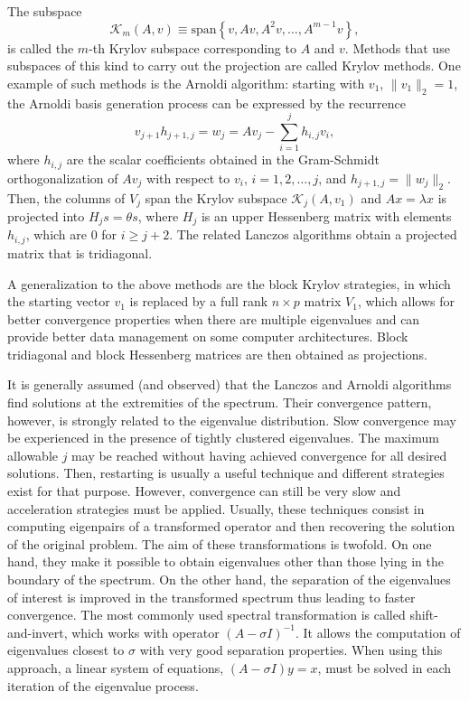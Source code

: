 	The subspace
\begin{equation}
\mathcal{K}_m(A,v)\equiv\mathrm{span}\left\{v,Av,A^2v,\ldots,A^{m-1}v\right\},\label{eq:krylov}
\end{equation}
is called the $m$-th Krylov subspace corresponding to $A$ and $v$. Methods that use subspaces of this kind to carry out the projection are called Krylov methods. One example of such methods is the Arnoldi algorithm: starting with $v_1$, $\|v_1\|_2=1$, the Arnoldi basis generation process can be expressed by the recurrence
\begin{equation}
v_{j+1}h_{j+1,j}=w_j=Av_j-\sum_{i=1}^jh_{i,j}v_i,
\end{equation}
where $h_{i,j}$ are the scalar coefficients obtained in the Gram-Schmidt orthogonalization of $Av_j$ with respect to $v_i$, $i=1,2,\ldots,j$, and $h_{j+1,j}=\|w_j\|_2$. Then, the columns of $V_j$ span the Krylov subspace $\mathcal{K}_j(A,v_1)$ and $Ax=\lambda x$ is projected into $H_js=\theta s$, where $H_j$ is an upper Hessenberg matrix with elements $h_{i,j}$, which are 0 for $i\geq j+2$. The related Lanczos algorithms obtain a projected matrix that is tridiagonal.

	A generalization to the above methods are the block Krylov strategies, in which the starting vector $v_1$ is replaced by a full rank $n\times p$ matrix $V_1$, which allows for better convergence properties when there are multiple eigenvalues and can provide better data management on some computer architectures. Block tridiagonal and block Hessenberg matrices are then obtained as projections.

	It is generally assumed (and observed) that the Lanczos and Arnoldi algorithms find solutions at the extremities of the spectrum. Their convergence pattern, however, is strongly related to the eigenvalue distribution. Slow convergence may be experienced in the presence of tightly clustered eigenvalues. The maximum allowable $j$ may be reached without having achieved convergence for all desired solutions. Then, restarting is usually a useful technique and different strategies exist for that purpose. However, convergence can still be very slow and acceleration strategies must be applied. Usually, these techniques consist in computing eigenpairs of a transformed operator and then recovering the solution of the original problem. The aim of these transformations is twofold. On one hand, they make it possible to obtain eigenvalues other than those lying in the boundary of the spectrum. On the other hand, the separation of the eigenvalues of interest is improved in the transformed spectrum thus leading to faster convergence. The most commonly used spectral transformation is called shift-and-invert, which works with operator $(A-\sigma I)^{-1}$. It allows the computation of eigenvalues closest to $\sigma$ with very good separation properties. When using this approach, a linear system of equations, $(A-\sigma I)y=x$, must be solved in each iteration of the eigenvalue process.

